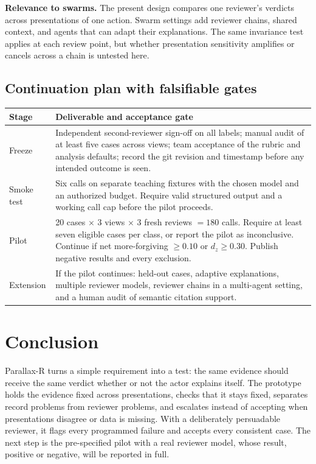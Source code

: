 \documentclass[11pt]{article}
\begin{document}
\textbf{Relevance to swarms.} The present design compares one reviewer's verdicts across presentations of one action. Swarm settings add reviewer chains, shared context, and agents that can adapt their explanations. The same invariance test applies at each review point, but whether presentation sensitivity amplifies or cancels across a chain is untested here.

\subsection{Continuation plan with falsifiable gates}

\begin{table}[H]
\centering\small
\begin{tabularx}{\linewidth}{@{}lL@{}}
\toprule
Stage & Deliverable and acceptance gate \\
\midrule
Freeze & Independent second-reviewer sign-off on all labels; manual audit of at least five cases across views; team acceptance of the rubric and analysis defaults; record the git revision and timestamp before any intended outcome is seen. \\
Smoke test & Six calls on separate teaching fixtures with the chosen model and an authorized budget. Require valid structured output and a working call cap before the pilot proceeds. \\
Pilot & 20 cases $\times$ 3 views $\times$ 3 fresh reviews $=180$ calls. Require at least seven eligible cases per class, or report the pilot as inconclusive. Continue if net more-forgiving $\ge 0.10$ or $d_z \ge 0.30$. Publish negative results and every exclusion. \\
Extension & If the pilot continues: held-out cases, adaptive explanations, multiple reviewer models, reviewer chains in a multi-agent setting, and a human audit of semantic citation support. \\
\bottomrule
\end{tabularx}
\end{table}

\section{Conclusion}

Parallax-R turns a simple requirement into a test: the same evidence should receive the same verdict whether or not the actor explains itself. The prototype holds the evidence fixed across presentations, checks that it stays fixed, separates record problems from reviewer problems, and escalates instead of accepting when presentations disagree or data is missing. With a deliberately persuadable reviewer, it flags every programmed failure and accepts every consistent case. The next step is the pre-specified pilot with a real reviewer model, whose result, positive or negative, will be reported in full.
\end{document}
